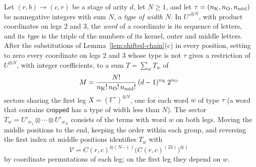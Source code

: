 \begin{lemma}\label{lem:stage-types}
Let \((r,b)\to(c,r)\) be a stage of arity \(d\), let \(N\ge1\), and let
\(\tau=(n_{\mathrm K},n_{\mathrm O},n_{\mathrm{mid}})\) be nonnegative integers with sum \(N\), a
\emph{type of width \(N\)}. In \(U'^{\otimes N}\), with product
coordinates on legs \(2\) and \(3\), the \emph{word} of a coordinate is
its sequence of letters, and its \emph{type} is the triple of the
numbers of its kernel, outer and middle letters. After the substitutions
of Lemma~\ref{lem:shifted-chain}(c) in every position, setting to zero
every coordinate on legs \(2\) and \(3\) whose type is not \(\tau\) gives
a restriction of \(U^{\otimes N}\), with integer coefficients, to a sum
\(T=\sum_wT_w\) of
\begin{equation}\label{eq:stage-sector-count}
 M=\frac{N!}{n_{\mathrm K}!\,n_{\mathrm O}!\,n_{\mathrm{mid}}!}\,(d-1)^{n_{\mathrm K}}\,2^{n_{\mathrm O}}
\end{equation}
sectors sharing the first leg \(X=(\mathbb F^r)^{\otimes N}\), one for each
word \(w\) of type \(\tau\) (a word that contains \(\mathsf{cropped}\) has a
type of width less than \(N\)). The sector
\(T_w=U'_{w_1}\otimes\cdots\otimes U'_{w_N}\) consists of the terms with
word \(w\) on both legs. Moving the middle positions to the end, keeping
the order within each group, and reversing the first index at middle
positions identifies \(T_w\) with
\begin{equation}\label{eq:stage-sector-tensor}
 \mathcal V=C(r,c)^{\otimes(N-\nmid)}\bigl(C(r,c)^{(23)}\bigr)^{\otimes\nmid}
\end{equation}
by coordinate permutations of each leg; on the first leg they depend
on \(w\).
\end{lemma}

